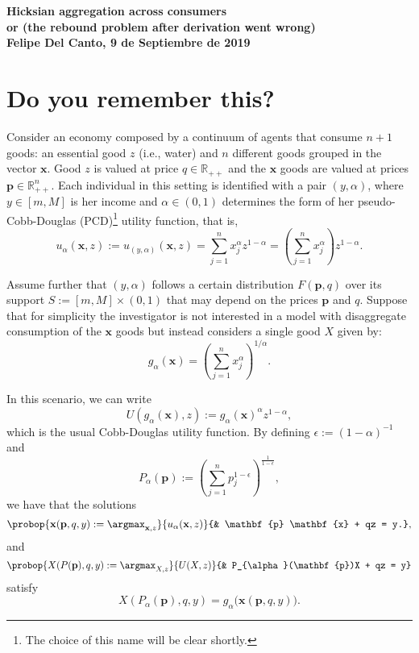 \documentclass[english, a4paper,12pt]{article}
\begin{document}
\begin{center} \bf \large
	Hicksian aggregation across consumers \\ or (the rebound problem after derivation went wrong) \\ Felipe Del Canto, 9 de Septiembre de 2019
\end{center}

\section{Do you remember this?}
Consider an economy composed by a continuum of agents that consume $n+1$ goods: an essential good $z$ (i.e., water) and $n$ different goods grouped in the vector $\mathbf{x}$. Good $z$ is valued at price $q \in \mathbb{R}_{++}$ and the $\mathbf{x}$ goods are valued at prices $\mathbf{p} \in \mathbb{R}^{n}_{++}$. Each individual in this setting is identified with a pair $(y,\alpha)$, where $y \in [m,M]$ is her income and $\alpha \in (0,1)$ determines the form of her pseudo-Cobb-Douglas (PCD)\footnote{The choice of this name will be clear shortly.} utility function, that is,
	$$u_{\alpha}(\mathbf{x},z) := u_{(y,\alpha)}(\mathbf{x},z) = \sum_{j=1}^{n} x_{j}^{\alpha}z^{1-\alpha} = \left(\sum_{j=1}^{n} x_{j}^{\alpha}\right)z^{1-\alpha}.$$
	
Assume further that $(y,\alpha)$ follows a certain distribution $F(\mathbf{p},q)$ over its support $S := [m,M] \times  (0,1)$ that may depend on the prices $\mathbf{p}$ and $q$. Suppose that for simplicity the investigator is not interested in a model with disaggregate consumption of the $\mathbf{x}$ goods but instead considers a single good $X$ given by: 
	$$g_{\alpha}(\mathbf{x}) = \left(\sum_{j=1}^{n} x_{j}^{\alpha}\right)^{1/\alpha}.$$

In this scenario, we can write
	$$U(g_{\alpha}(\mathbf{x}), z) := g_{\alpha}(\mathbf{x})^{\alpha}z^{1-\alpha},$$
which is the usual Cobb-Douglas utility function. By defining $\epsilon := (1-\alpha)^{-1}$ and
	$$P_{\alpha}(\mathbf{p}) :=  \left( \sum_{j=1}^{n} p_{j}^{1-\epsilon} \right)^{\frac{1}{1-\epsilon}},$$
we have that the solutions
	\begin{equation} \label{eq:probdisagg}
		\probop{\mathbf{x}(\mathbf{p}, q, y) 
			:= \argmax_{\mathbf{x}, z}}{u_{\alpha}(\mathbf{x}, z)}
				{&	\mathbf{p} \mathbf{x} + qz = y.},
	\end{equation} 
and
	\begin{equation} \label{eq:probagg}
		\probop{X(P(\mathbf{p}), q, y) := \argmax_{X, z}}{U(X,z)}
										{&	P_{\alpha}(\mathbf{p})X + qz = y}
	\end{equation}
satisfy
	$$X(P_{\alpha}(\mathbf{p}), q, y) = g_{\alpha}\big(\mathbf{x}(\mathbf{p}, q, y)\big).$$
\end{document}
